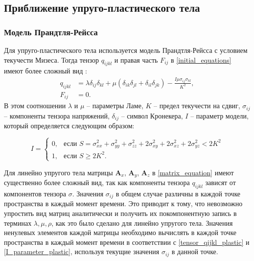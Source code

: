 
\clearpage
\newpage

\subsection{Приближение упруго-пластического тела}

\subsubsection{Модель Прандтля-Рейсса}
\label{plastic_matrixes}

Для упруго-пластического тела используется модель Прандтля-Рейсса с условием текучести Мизеса. Тогда тензор $q_{ijkl}$ и правая часть $F_{ij}$ в \eqref{initial_equations} имеют более сложный вид \cite{ivanov_kondaurov_petrov_holodov, g}:
\begin{align}
\label{tensor_qijkl_plastic}
q_{ijkl}&=\lambda\delta_{ij}\delta_{kl}+\mu(\delta_{ik}\delta_{jl}+\delta_{il}\delta_{jk})-\frac{I\mu\sigma_{ij}\sigma_{kl}}{K^2},
\nonumber\\
F_{ij}&=0.
\end{align}
В этом соотношении $\lambda$ и $\mu$ -- параметры Ламе, $K$ -- предел текучести на сдвиг, $\sigma_{ij}$ -- компоненты тензора напряжений, $\delta_{ij}$ -- символ Кронекера, $I$ -- параметр модели, который определяется следующим образом:

\begin{equation}
\label{I_parameter_plastic}
I=\begin{cases}
0, & \text{если $S = \sigma_{xx}^2+\sigma_{yy}^2+\sigma_{zz}^2+2\sigma_{xy}^2+2\sigma_{xz}^2+2\sigma_{yz}^2 < 2K^2$}\\
1, & \text{если $S \ge 2K^2$}.
\end{cases}
\end{equation}

Для линейно упругого тела матрицы $\mathbf{A}_x$, $\mathbf{A}_y$, $\mathbf{A}_z$ в \eqref{matrix_equation} имеют существенно более сложный вид, так как компоненты тензора $q_{ijkl}$ зависят от компонентов тензора $\sigma$. Значения $\sigma_{ij}$ в общем случае различны в каждой точке пространства в каждый момент времени. Это приводит к тому, что невозможно упростить вид матриц аналитически и получить их покомпонентную запись в терминах $\lambda, \mu, \rho$, как это было сделано для линейно упругого тела. Значения ненулевых элементов каждой матрицы необходимо вычислять в каждой точке пространства в каждый момент времени в соответствии с \eqref{tensor_qijkl_plastic} и \eqref{I_parameter_plastic}, используя текущие значения $\sigma_{ij}$ в данной точке.


